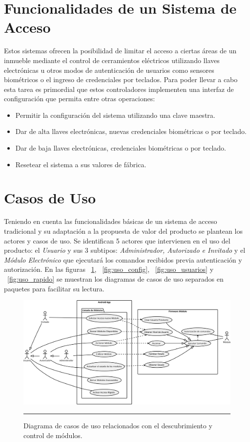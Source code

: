 \section{Funcionalidades de un Sistema de Acceso}
Estos sistemas ofrecen la posibilidad de limitar el acceso a ciertas áreas de un inmueble mediante el control de cerramientos eléctricos utilizando llaves electrónicas u otros modos de autenticación de usuarios como sensores biométricos o el ingreso de credenciales por teclados. Para poder llevar a cabo esta tarea es primordial que estos controladores implementen una interfaz de configuración que permita entre otras operaciones:
\begin{itemize}
	\item Permitir la configuración del sistema utilizando una clave maestra.
	\item Dar de alta llaves electrónicas, nuevas credenciales biométricas o por teclado.
	\item Dar de baja llaves electrónicas, credenciales biométricas o por teclado.
	\item Resetear el sistema a sus valores de fábrica.
\end{itemize}
\section{Casos de Uso}
Teniendo en cuenta las funcionalidades básicas de un sistema de acceso tradicional y su adaptación a la propuesta de valor del producto se plantean los actores y casos de uso. %
Se identifican 5 actores que intervienen en el uso del producto: el \emph{Usuario} y sus 3 subtipos: \emph{Administrador, Autorizado e Invitado} y el \emph{Módulo Electrónico} que ejecutará los comandos recibidos previa autenticación y autorización.
En las figuras ~\ref{fig:uso_listado}, ~\ref{fig:uso_config}, ~\ref{fig:uso_usuarios} y ~\ref{fig:uso_rapido} se muestran los diagramas de casos de uso separados en paquetes para facilitar su lectura.
\begin{figure}[htbp]
	\centering
	\includegraphics[width=\textwidth]{Figures/reque/USE_listado.png}
	\rule{35em}{1pt}
	\caption[Diagrama de Casos de Uso]{Diagrama de casos de uso relacionados con el descubrimiento y control de módulos.}
	\label{fig:uso_listado}
\end{figure}

